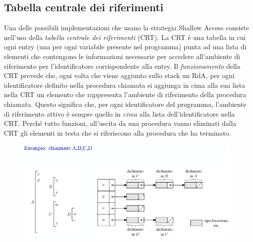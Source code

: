 \documentclass[a4paper,oneside,titlepage]{book}
\begin{document}
\subsection{Tabella centrale dei riferimenti}
Una delle possibili implementazioni che usano la strategia Shallow Access consiste nell'uso della \textit{tabella centrale dei riferimenti} (CRT). La CRT è una tabella in cui ogni entry (una per ogni variabile presente nel programma) punta ad una lista di elementi che contengono le informazioni necessarie per accedere all'ambiente di riferimento per l'identificatore corrispondente alla entry. Il \textit{funzionamento} della CRT prevede che, ogni volta che viene aggiunto sullo stack un RdA, per ogni identificatore definito nella procedura chiamata si aggiunga in cima alla sua lista nella CRT un elemento che rappresenta l'ambiente di riferimento della procedura chiamata. Questo significa che, per ogni identificatore del programma, l'ambiente di riferimento attivo è sempre quello in \textit{cima} alla lista dell'identificatore nella CRT. Perché tutto funzioni, all'uscita da una procedura vanno eliminati dalla CRT gli elementi in testa che si riferiscono alla procedura che ha terminato.
\begin{figure}[htp]
	\centering
	\includegraphics[width=\textwidth, height=\textheight, keepaspectratio]{crt.png}
\end{figure}
\end{document}
